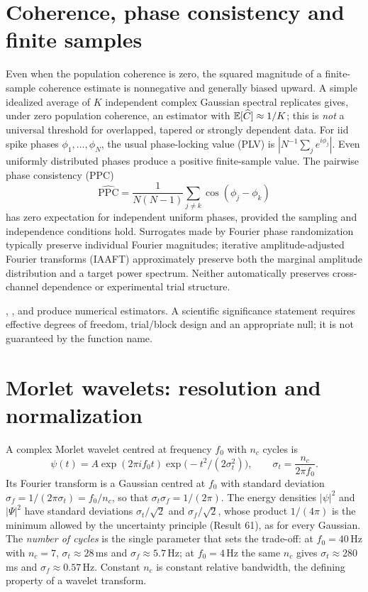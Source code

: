 \section{Coherence, phase consistency and finite samples}
Even when the population coherence is zero, the squared
magnitude of a finite-sample coherence estimate is nonnegative
and generally biased upward. A simple idealized average of
$K$ independent complex Gaussian spectral replicates gives,
under zero population coherence, an estimator with
$\mathbb{E}[\widehat C]\approx1/K$; this is \emph{not} a universal
threshold for overlapped, tapered or strongly dependent data.
For iid spike phases $\phi_1,\ldots,\phi_N$, the usual
phase-locking value (PLV) is $|N^{-1}\sum_j e^{i\phi_j}|$.
Even uniformly distributed phases produce a positive finite-sample
value. The pairwise phase consistency (PPC)
\[
\widehat{\mathrm{PPC}}=
\frac{1}{N(N-1)}\sum_{j\ne k}
\cos(\phi_j-\phi_k)
\]
has zero expectation for independent uniform phases,
provided the sampling and independence conditions hold.
Surrogates made by Fourier phase randomization typically preserve
individual Fourier magnitudes; iterative amplitude-adjusted Fourier
transforms (IAAFT) approximately preserve both the marginal amplitude
distribution and a target power spectrum. Neither automatically
preserves cross-channel dependence or experimental trial structure.

\begin{example}\sloppy
{},
,
 and
produce numerical estimators. A scientific significance statement
requires effective degrees of freedom, trial/block design and
an appropriate null; it is not guaranteed by the function name.
\end{example}
\section{Morlet wavelets: resolution and normalization}
A complex Morlet wavelet centred at frequency $f_0$ with $n_c$ cycles is
\[
\psi(t)=A\exp(2\pi if_0t)\exp\bigl(-t^2/(2\sigma_t^2)\bigr),\qquad
\sigma_t=\frac{n_c}{2\pi f_0}.
\] Its Fourier transform is a Gaussian centred at
$f_0$ with standard deviation $\sigma_f=1/(2\pi\sigma_t)=f_0/n_c$, so
that $\sigma_t\sigma_f=1/(2\pi)$. The energy densities $|\psi|^2$ and
$|\Psi|^2$ have standard deviations $\sigma_t/\sqrt2$ and
$\sigma_f/\sqrt2$, whose product $1/(4\pi)$ is the minimum allowed by the
uncertainty principle (Result 61), as for every Gaussian. The \emph{number of cycles}
is the single parameter that sets the trade-off: at $f_0=40$\,Hz with
$n_c=7$, $\sigma_t\approx28$\,ms and $\sigma_f\approx5.7$\,Hz; at
$f_0=4$\,Hz the same $n_c$ gives $\sigma_t\approx280$\,ms and
$\sigma_f\approx0.57$\,Hz. Constant $n_c$ is constant relative
bandwidth, the defining property of a wavelet transform.

